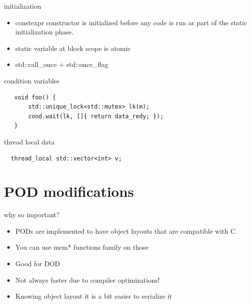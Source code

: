 \documentclass{beamer}
\begin{document}
\begin{frame}{initialization}
  \begin{block}{}
    \begin{itemize}
    \item constexpr constructor is initialized before any code is run
      as part of the static initialization phase.
    \item static variable at block scope is atomic
    \item std::call\_once + std::once\_flag
    \end{itemize}
  \end{block}
\end{frame}

\begin{frame}{condition variables}
\begin{block}{}
\begin{verbatim}
   void foo() {
       std::unique_lock<std::mutex> lk(m);
       cond.wait(lk, []{ return data_redy; });
   }

\end{verbatim}
\end{block}
\end{frame}

\begin{frame}{thread local data}
  \begin{block}{}
\begin{verbatim}
  thread_local std::vector<int> v;

\end{verbatim}
  \end{block}
\end{frame}

\section{POD modifications}
\begin{frame}{why so important?}
  \begin{itemize}
  \item PODs are implemented to have object layouts that are compatible with
    C.
  \item You can use mem* functions family on those
  \item Good for DOD
  \item Not always faster due to compiler optimizations!
  \item Knowing object layout it is a bit easier to serialize it
  \end{itemize}
\end{frame}
\end{document}

